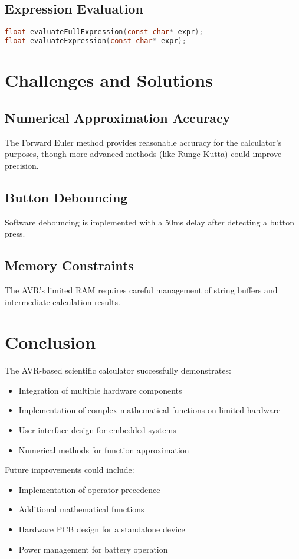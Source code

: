 \documentclass{article}
\begin{document}
\subsection{Expression Evaluation}
\begin{lstlisting}[language=C]
float evaluateFullExpression(const char* expr);
float evaluateExpression(const char* expr);
\end{lstlisting}

\section{Challenges and Solutions}
\subsection{Numerical Approximation Accuracy}
The Forward Euler method provides reasonable accuracy for the calculator's purposes, though more advanced methods (like Runge-Kutta) could improve precision.

\subsection{Button Debouncing}
Software debouncing is implemented with a 50ms delay after detecting a button press.

\subsection{Memory Constraints}
The AVR's limited RAM requires careful management of string buffers and intermediate calculation results.

\section{Conclusion}
The AVR-based scientific calculator successfully demonstrates:
\begin{itemize}
    \item Integration of multiple hardware components
    \item Implementation of complex mathematical functions on limited hardware
    \item User interface design for embedded systems
    \item Numerical methods for function approximation
\end{itemize}

Future improvements could include:
\begin{itemize}
    \item Implementation of operator precedence
    \item Additional mathematical functions
    \item Hardware PCB design for a standalone device
    \item Power management for battery operation
\end{itemize}
\end{document}
